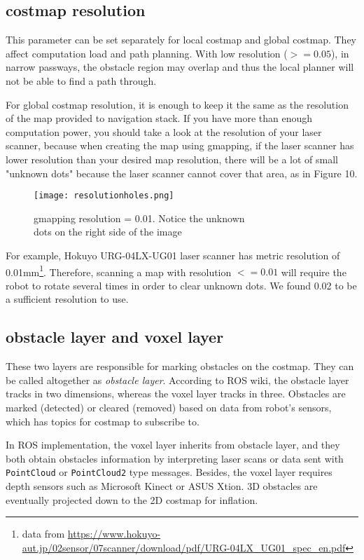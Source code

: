 \documentclass[12pt]{article}
\begin{document}
\subsection{costmap resolution} 
This parameter can be set separately for local costmap and global costmap. They affect computation load and path planning. With low resolution ($>=0.05$), in narrow passways, the obstacle region may overlap and thus the local planner will not be able to find a path through.

For global costmap resolution, it is enough to keep it the same as the resolution of the map provided to navigation stack. If you have more than enough computation power,
you should take a look at the resolution of your laser scanner, because when creating the map using gmapping, if the laser scanner has lower resolution than your desired
map resolution, there will be a lot of small "unknown dots" because the laser scanner cannot cover that area, as in Figure 10.
\begin{figure}[!h]
    \begin{center}
        \texttt{[image: resolutionholes.png]}
      \caption{gmapping resolution = 0.01. Notice the unknown\\ dots on the right side of the image}
    \end{center}
\end{figure}

For example, Hokuyo URG-04LX-UG01 laser scanner has metric resolution of 0.01mm\footnote{data from \url{https://www.hokuyo-aut.jp/02sensor/07scanner/download/pdf/URG-04LX_UG01_spec_en.pdf}}. Therefore, scanning a map with resolution $<=0.01$ will require the robot to rotate several times in order to clear unknown dots. We found 0.02 to be a sufficient resolution
to use.


\subsection{obstacle layer and voxel layer} These two layers are responsible for marking obstacles on the costmap. They can be called altogether as \textit{obstacle layer}. According to ROS wiki, the obstacle layer tracks in two dimensions, whereas the voxel layer tracks in three. Obstacles are marked (detected) or cleared (removed) based on data from robot's sensors, which has topics for costmap to subscribe to.

In ROS implementation, the voxel layer inherits from obstacle layer, and they both obtain obstacles information by interpreting laser scans or data sent with \texttt{PointCloud} or \texttt{PointCloud2} type messages. Besides, the voxel layer requires depth sensors such as Microsoft Kinect or ASUS Xtion. 3D obstacles are eventually projected down to the 2D costmap for inflation.
\end{document}
